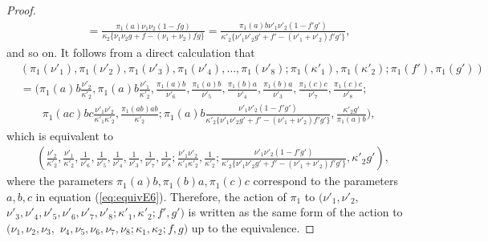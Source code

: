 \documentclass[10pt,a4paper]{amsart}
\begin{document}
\begin{proof}
\begin{align}
&  \quad = \frac{ \pi _1 ( a ) \nu _1 \nu_2 ( 1- fg )}{ \kappa_2 \{ \nu _1 \nu_2 g + f- (\nu _1 + \nu _2 ) fg \} }  = \frac{ \pi _1 ( a ) b \nu '_1 \nu '_2 ( 1- f'g' )}{ \kappa ' _2 \{ \nu '_1 \nu'_2 g' + f' - (\nu '_1 + \nu '_2 ) f' g' \} }  , \nonumber
\end{align}
and so on.
It follows from a direct calculation that
\begin{align}
& (\pi _1 ( \nu '_1) , \pi _1 (\nu '_2) , \pi _1 ( \nu '_3) , \pi _1 ( \nu '_4) , \dots , \pi _1 (\nu '_8) ; \pi _1 (\kappa '_1) , \pi _1 (\kappa '_2) ;  \pi _1 (f' ) , \pi _1 (g') ) \\
& = ( \pi _1 ( a ) b \frac{ \nu '_2 }{ \kappa ' _2} , \pi _1 ( a ) b \frac{ \nu '_1 }{\kappa ' _2} ,  \frac{ \pi _1 ( a ) b  }{ \nu '_6 }  , \frac{ \pi _1 ( a ) b  }{ \nu '_5 } , \frac{  \pi _1 ( b ) a }{ \nu '_4 } , \frac{ \pi _1 ( b ) a }{ \nu '_3} , \frac{ \pi _1 (c ) c }{ \nu '_7} , \frac{ \pi _1 ( c ) c }{ \nu '_8} ; \nonumber \\
& \qquad \pi _1 ( a c) b c  \frac{  \nu '_1 \nu '_2 }{ \kappa '_1\kappa '_2}  , \frac{ \pi _1 ( ab ) ab }{\kappa '_2 }  ; \pi _1 ( a ) b  \frac{\nu '_1 \nu '_2 ( 1- f'g' )}{ \kappa ' _2 \{ \nu '_1 \nu'_2 g' + f' - (\nu '_1 + \nu '_2 ) f' g' \} } , \frac{\kappa '_2 g' }{\pi _1 ( a ) b }  ) , \nonumber 
\end{align} 
which is equivalent to
\begin{align}
& ( \frac{ \nu '_2 }{ \kappa ' _2} , \frac{ \nu '_1 }{\kappa ' _2} ,  \frac{1 }{ \nu '_6 }  , \frac{ 1 }{ \nu '_5 } , \frac{1 }{ \nu '_4 } , \frac{ 1}{ \nu '_3} , \frac{ 1 }{ \nu '_7} , \frac{ 1 }{ \nu '_8} ;  \frac{  \nu '_1 \nu '_2 }{ \kappa '_1\kappa '_2}  , \frac{ 1 }{\kappa '_2 }  ;   \frac{\nu '_1 \nu '_2 ( 1- f'g' )}{ \kappa ' _2 \{ \nu '_1 \nu'_2 g' + f' - (\nu '_1 + \nu '_2 ) f' g' \} } , \kappa '_2 g'  ) ,
\end{align} 
where the parameters $\pi _1 ( a ) b  ,  \pi _1 ( b ) a ,  \pi _1 ( c ) c$ correspond to the parameters $a,b,c $ in equation (\ref{eq:equivE6}).
Therefore, the action of $\pi _1 $ to $(\nu '_1 , \nu '_2 ,$ $ \nu '_3 , \nu '_4 ,\nu '_5 ,\nu '_6 , \nu '_7 ,\nu '_8 ; \kappa '_1 ,\kappa '_2 ; f' ,g' ) $ is written as the same form of the action to $(\nu _1 , \nu _2 , \nu _3 ,$ $ \nu _4 ,\nu _5 ,\nu _6 , \nu _7 ,\nu _8 ; \kappa _1 ,\kappa _2 ; f ,g ) $ up to the equivalence.

\end{proof}
\end{document}
